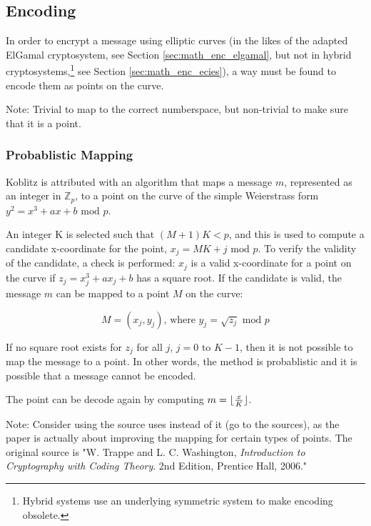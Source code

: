 \subsection{Encoding}
\label{sec:math_encoding}

In order to encrypt a message using elliptic curves (in the likes of the adapted ElGamal cryptosystem, see Section \ref{sec:math_enc_elgamal},
but not in hybrid cryptosystems,\footnote{Hybrid systems use an underlying symmetric system to make encoding obsolete.} see Section
\ref{sec:math_enc_ecies}), a way must be found to encode them as points on the curve.

Note: Trivial to map to the correct numberspace, but non-trivial to make sure that it is a point.

\subsubsection{Probablistic Mapping}

Koblitz is attributed with an algorithm that maps a message \(m\), represented as an integer in \(\mathbb{Z}_p\), to a point on the curve of the
simple Weierstrass form \(y^2 = x^3 + ax + b \text{ mod } p\).

An integer K is selected such that \((M + 1)K < p\), and this is used to compute
a candidate x-coordinate for the point, \(x_j = MK + j \text{ mod } p\). To verify the validity of the candidate, a check is performed: \(x_j\)
is a valid x-coordinate for a point on the curve if \(z_j = x_j^3 + ax_j + b\) has a square root. If the candidate is valid, the message \(m\)
can be mapped to a point \(M\) on the curve:

\begin{equation}
	M = (x_j, y_j) \text{, where } y_j = \sqrt{z_j} \text{ mod } p
\end{equation}

If no square root exists for \(z_j\) for all \(j\), \(j = 0 \text{ to } K-1\), then it is not possible to map the message to a point. In other
words, the method is probablistic and it is possible that a message cannot be encoded.\cite{MappingAMessage}

The point can be decode again by computing \(m = {\lfloor {{x} \over {K}} \rfloor}\).

Note: Consider using the source \cite{MappingAMessage} uses instead of it (go to the sources), as the paper is actually about improving the mapping
for certain types of points. The original source is "W. Trappe and L. C. Washington, \emph{Introduction to Cryptography with Coding Theory}. 2nd Edition,
Prentice Hall, 2006."

